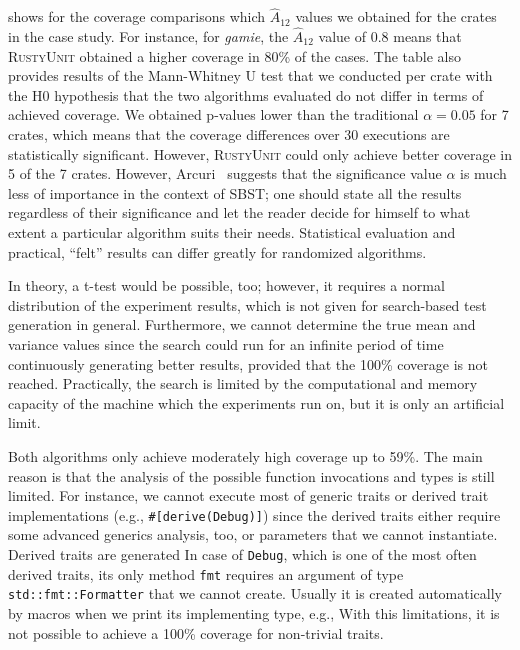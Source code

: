 \documentclass[paper=a4,%
  twoside,%
  BCOR4mm,%
  abstract=true,%
  toc=bibliography,%
  chapterprefix=true,%
  toc=bibliographynumbered,%
  open=right,%
  english,%
  pagesize=pdftex]{scrreprt}
\newcommand{\tech}{\textsc{RustyUnit}\xspace}
\newcommand{\runs}{30\xspace}
\begin{document}
 shows for the coverage comparisons which $\hat{A}_{12}$ values we obtained for the crates in the case study. For instance, for \emph{gamie}, the $\hat{A}_{12}$ value of 0.8 means that \tech obtained a higher coverage in 80\% of the cases. The table also provides results of the Mann-Whitney U test that we conducted per crate with the H0 hypothesis that the two algorithms evaluated do not differ in terms of achieved coverage. 
We obtained p-values lower than the traditional $\alpha = 0.05$ for 7 crates, which means that the coverage differences over \runs executions are statistically significant. However, \tech could only achieve better coverage in 5 of the 7 crates. However, Arcuri~\cite{Arcuri2011} suggests that the significance value $\alpha$ is much less of importance in the context of \ac{SBST}; one should state all the results regardless of their significance and let the reader decide for himself to what extent a particular algorithm suits their needs. Statistical evaluation and practical, ``felt'' results can differ greatly for randomized algorithms.


In theory, a t-test would be possible, too; however, it requires a normal distribution of the experiment results, which is not given for search-based test generation in general. Furthermore, we cannot determine the true mean and variance values since the search could run for an infinite period of time continuously generating better results, provided that the 100\% coverage is not reached. Practically, the search is limited by the computational and memory capacity of the machine which the experiments run on, but it is only an artificial limit. 

Both algorithms only achieve moderately high coverage up to 59\%. The main reason is that the analysis of the possible function invocations and types is still limited. For instance, we cannot execute most of generic traits or derived trait implementations (e.g., \texttt{\#[derive(Debug)]}) since the derived traits either require some advanced generics analysis, too, or parameters that we cannot instantiate. Derived traits are generated  In case of \texttt{Debug}, which is one of the most often derived traits, its only method \texttt{fmt} requires an argument of type \texttt{std::fmt::Formatter} that we cannot create. Usually it is created automatically by macros when we print its implementing type, e.g., %
With this limitations, it is not possible to achieve a 100\% coverage for non-trivial traits. 
\end{document}
